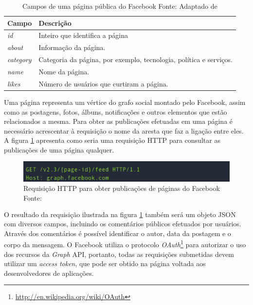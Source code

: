 \begin{table}[!ht]
\begin{center}
  \begin{tabular}{|p{5cm}|p{7cm}|}
	\hline
	Campo & Descrição
	\\ \hline
	\textit{id} &  Inteiro que identifica a página
	\\ \hline
	\textit{about} & Informação da página.
	\\ \hline
	\textit{category} & Categoria da página, por exemplo, tecnologia, política e serviços.
	\\ \hline
	\textit{name} & Nome da página.
	\\ \hline
	\textit{likes} & Número de usuários que curtiram a página.
	\\ \hline
  \end{tabular}
  \captionsetup{justification=centering}
  \caption[Campos de uma página pública do Facebook]{Campos de uma página pública do Facebook
  \protect\linebreak Fonte: Adaptado de \cite{facebook-page-doc}}
\label{tab-fb-campos}
\end{center}
\end{table}
\FloatBarrier

Uma página representa um vértice do grafo social montado pelo Facebook, assim como as postagens, fotos, álbuns, notificações e outros elementos que estão relacionados a mesma. Para obter as publicações efetuadas em uma página é necessário acrescentar à requisição o nome da aresta que faz a ligação entre eles. A figura \ref{facebook-rest} apresenta como seria uma requisição HTTP para consultar as publicações de uma página qualquer.

\begin{figure}[ht!]
	\centering
	\includegraphics[keepaspectratio=true,scale=0.35]
	  {figuras/fb-http.eps}
	\caption[Requisição HTTP para obter publicações de páginas do Facebook]{Requisição HTTP para obter publicações de páginas do Facebook
	\protect\linebreak Fonte: \cite{facebook-page-doc}}
	\label{facebook-rest}
\end{figure}
\FloatBarrier

O resultado da requisição ilustrada na figura \ref{facebook-rest} também será um objeto JSON com diversos campos, incluindo os comentários públicos efetuados por usuários. Através dos comentários é possível identificar o autor, data da postagem e o corpo da mensagem. O Facebook utiliza o protocolo \textit{OAuth}\footnote{\url{http://en.wikipedia.org/wiki/OAuth}} para autorizar o uso dos recursos da \textit{Graph} API, portanto, todas as requisições submetidas devem utilizar um \textit{access token}, que pode ser obtido na página voltada aos desenvolvedores de aplicações.

